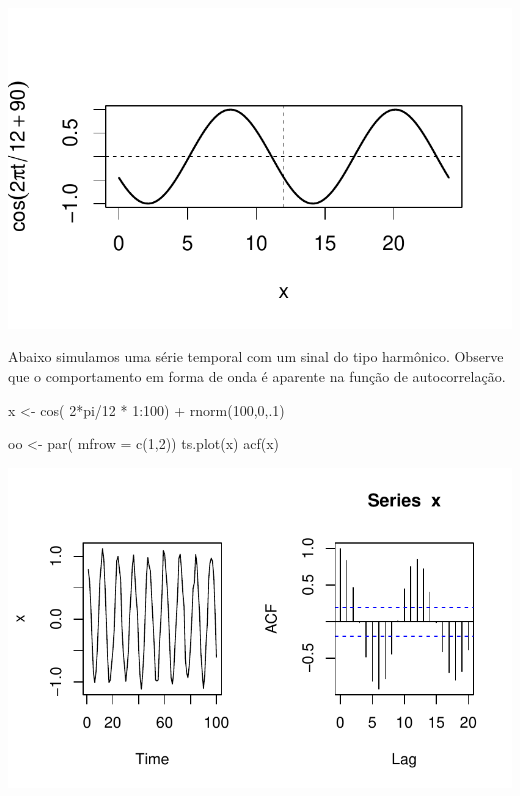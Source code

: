 \documentclass[
  letterpaper,
  DIV=11,
  numbers=noendperiod]{scrreprt}
\newenvironment{Shaded}{\begin{snugshade}}{\end{snugshade}}
\newcommand{\AttributeTok}[1]{\textcolor[rgb]{0.40,0.45,0.13}{#1}}
\newcommand{\DecValTok}[1]{\textcolor[rgb]{0.68,0.00,0.00}{#1}}
\newcommand{\FunctionTok}[1]{\textcolor[rgb]{0.28,0.35,0.67}{#1}}
\newcommand{\NormalTok}[1]{\textcolor[rgb]{0.00,0.23,0.31}{#1}}
\newcommand{\OtherTok}[1]{\textcolor[rgb]{0.00,0.23,0.31}{#1}}
\newcommand{\SpecialCharTok}[1]{\textcolor[rgb]{0.37,0.37,0.37}{#1}}
\begin{document}
\includegraphics{sinal_files/figure-pdf/unnamed-chunk-8-3.pdf}

Abaixo simulamos uma série temporal com um sinal do tipo harmônico.
Observe que o comportamento em forma de onda é aparente na função de
autocorrelação.

\begin{Shaded}
\begin{Highlighting}[]
\NormalTok{x }\OtherTok{\textless{}{-}} \FunctionTok{cos}\NormalTok{( }\DecValTok{2}\SpecialCharTok{*}\NormalTok{pi}\SpecialCharTok{/}\DecValTok{12} \SpecialCharTok{*} \DecValTok{1}\SpecialCharTok{:}\DecValTok{100}\NormalTok{) }\SpecialCharTok{+} \FunctionTok{rnorm}\NormalTok{(}\DecValTok{100}\NormalTok{,}\DecValTok{0}\NormalTok{,.}\DecValTok{1}\NormalTok{)}

\NormalTok{oo }\OtherTok{\textless{}{-}} \FunctionTok{par}\NormalTok{( }\AttributeTok{mfrow =} \FunctionTok{c}\NormalTok{(}\DecValTok{1}\NormalTok{,}\DecValTok{2}\NormalTok{))}
\FunctionTok{ts.plot}\NormalTok{(x)}
\FunctionTok{acf}\NormalTok{(x)}
\end{Highlighting}
\end{Shaded}

\includegraphics{sinal_files/figure-pdf/unnamed-chunk-9-1.pdf}
\end{document}
